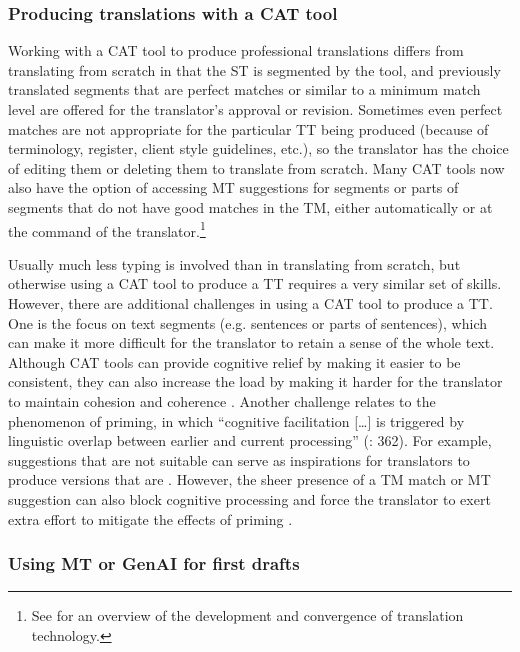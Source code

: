 \documentclass[output=paper]{langscibook}
\begin{document}
\subsubsection{Producing translations with a CAT tool} %

Working with a CAT tool to produce professional translations differs from translating from scratch in that the ST is segmented by the tool, and previously translated segments that are perfect matches or similar to a minimum match level are offered for the translator’s approval or revision. Sometimes even perfect matches are not appropriate for the particular TT being produced (because of terminology, register, client style guidelines, etc.), so the translator has the choice of editing them or deleting them to translate from scratch. Many CAT tools now also have the option of accessing MT suggestions for segments or parts of segments that do not have good matches in the TM, either automatically or at the command of the translator.\footnote{ \textrm{See \citet{kappus_language_2024} for an overview of the development and convergence of translation technology.}} 

Usually much less typing is involved than in translating from scratch, but otherwise using a CAT tool to produce a TT requires a very similar set of skills. However, there are additional challenges in using a CAT tool to produce a TT. One is the focus on text segments (e.g. sentences or parts of sentences), which can make it more difficult for the translator to retain a sense of the whole text. Although CAT tools can provide cognitive relief by making it easier to be consistent, they can also increase the load by making it harder for the translator to maintain cohesion and coherence \citep{kruger_contextualising_2016}. Another challenge relates to the phenomenon of priming, in which “cognitive facilitation […] is triggered by linguistic overlap between earlier and current processing” (\citealt{vandepitte_linguistics_2018}: 362). For example, suggestions that are not suitable can serve as inspirations for translators to produce versions that are \citep{farrell_translators_2023}. However, the sheer presence of a TM match or MT suggestion can also block cognitive processing and force the translator to exert extra effort to mitigate the effects of priming \citep{kolb_2024}.

\subsubsection{Using MT or GenAI for first drafts} %
\end{document}
